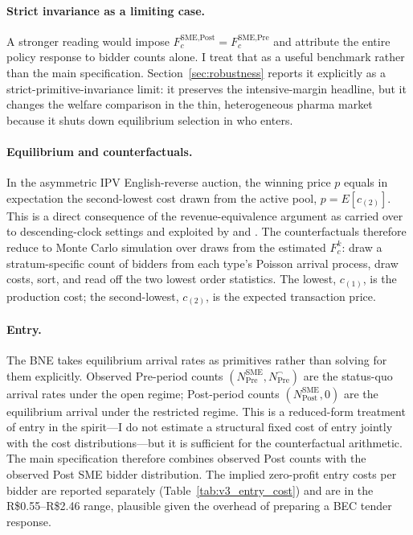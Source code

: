 \paragraph{Strict invariance as a limiting case.} A stronger reading would impose $F_c^{\text{SME,Post}} = F_c^{\text{SME,Pre}}$ and attribute the entire policy response to bidder counts alone. I treat that as a useful benchmark rather than the main specification. Section~\ref{sec:robustness} reports it explicitly as a strict-primitive-invariance limit: it preserves the intensive-margin headline, but it changes the welfare comparison in the thin, heterogeneous pharma market because it shuts down equilibrium selection in who enters.

\paragraph{Equilibrium and counterfactuals.} In the asymmetric IPV English-reverse auction, the winning price $p$ equals in expectation the second-lowest cost drawn from the active pool, $p = E[c_{(2)}]$. This is a direct consequence of the \citet{vickrey1961} revenue-equivalence argument as carried over to descending-clock settings and exploited by \citet{krasnokutskaya2011} and \citet{maskinriley2000}. The counterfactuals therefore reduce to Monte Carlo simulation over draws from the estimated $F_c^k$: draw a stratum-specific count of bidders from each type's Poisson arrival process, draw costs, sort, and read off the two lowest order statistics. The lowest, $c_{(1)}$, is the production cost; the second-lowest, $c_{(2)}$, is the expected transaction price.

\paragraph{Entry.} The BNE takes equilibrium arrival rates as primitives rather than solving for them explicitly. Observed Pre-period counts $(N^{\text{SME}}_{\text{Pre}}, N^{\neg}_{\text{Pre}})$ are the status-quo arrival rates under the open regime; Post-period counts $(N^{\text{SME}}_{\text{Post}}, 0)$ are the equilibrium arrival under the restricted regime. This is a reduced-form treatment of entry in the \citet{atheyseira2011} spirit---I do not estimate a structural fixed cost of entry jointly with the cost distributions---but it is sufficient for the counterfactual arithmetic. The main specification therefore combines observed Post counts with the observed Post SME bidder distribution. The implied zero-profit entry costs per bidder are reported separately (Table~\ref{tab:v3_entry_cost}) and are in the R\$0.55--R\$2.46 range, plausible given the overhead of preparing a BEC tender response.


